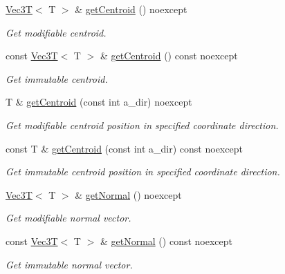 \begin{DoxyCompactItemize}
\hyperlink{classVec3T}{Vec3T}$<$ T $>$ \& \hyperlink{classDcel_1_1FaceT_a1b9c15538b2d7840a11b30f5e236c2a9}{get\+Centroid} () noexcept
\begin{DoxyCompactList}\small\item\em Get modifiable centroid. \end{DoxyCompactList}\item 
\mbox{\label{classDcel_1_1FaceT_af2bf6614093074f450b2e0e5ea58682a}} 
const \hyperlink{classVec3T}{Vec3T}$<$ T $>$ \& \hyperlink{classDcel_1_1FaceT_af2bf6614093074f450b2e0e5ea58682a}{get\+Centroid} () const noexcept
\begin{DoxyCompactList}\small\item\em Get immutable centroid. \end{DoxyCompactList}\item 
T \& \hyperlink{classDcel_1_1FaceT_a43e5b9aebe8736a42568ae0e6fbb6db3}{get\+Centroid} (const int a\+\_\+dir) noexcept
\begin{DoxyCompactList}\small\item\em Get modifiable centroid position in specified coordinate direction. \end{DoxyCompactList}\item 
const T \& \hyperlink{classDcel_1_1FaceT_ac835d260a630e303babd7f87eb7d5a1a}{get\+Centroid} (const int a\+\_\+dir) const noexcept
\begin{DoxyCompactList}\small\item\em Get immutable centroid position in specified coordinate direction. \end{DoxyCompactList}\item 
\mbox{\label{classDcel_1_1FaceT_a0e6079ca8d45b2e2090bd6202c7a679e}} 
\hyperlink{classVec3T}{Vec3T}$<$ T $>$ \& \hyperlink{classDcel_1_1FaceT_a0e6079ca8d45b2e2090bd6202c7a679e}{get\+Normal} () noexcept
\begin{DoxyCompactList}\small\item\em Get modifiable normal vector. \end{DoxyCompactList}\item 
\mbox{\label{classDcel_1_1FaceT_adff3ebb9eba8d500e21fed65b32ea8fb}} 
const \hyperlink{classVec3T}{Vec3T}$<$ T $>$ \& \hyperlink{classDcel_1_1FaceT_adff3ebb9eba8d500e21fed65b32ea8fb}{get\+Normal} () const noexcept
\begin{DoxyCompactList}\small\item\em Get immutable normal vector. \end{DoxyCompactList}\item 

\end{DoxyCompactItemize}
